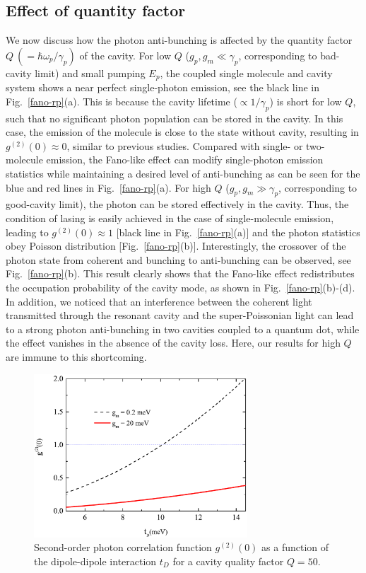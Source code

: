 \documentclass[aps,prb,
,floatfix,footinbib,longbibliography,
preprint
]{revtex4-1}
\begin{document}
\subsection{Effect of quantity factor}
We now discuss how the photon anti-bunching is affected by the quantity factor $Q~(=\hbar\omega_{p}/\gamma_{p})$ of the cavity.
For low $Q$ ($g_{p},g_{m}\ll \gamma_{p}$, corresponding to bad-cavity limit) and small pumping $E_{p}$, the coupled single molecule and cavity system shows a near perfect single-photon emission, see the black line in Fig.~\ref{fano-rp}(a).
This is because the cavity lifetime ($\propto 1/\gamma_{p}$) is short for low $Q$, such that no significant photon population can be stored in the cavity.
In this case, the emission of the molecule is close to the state without cavity, resulting in $g^{(2)}(0)\approx0$, similar to previous studies\cite{PhysRevB.70.115304,PhysRevA.91.061804}.
Compared with single- or two-molecule emission, the Fano-like effect can modify single-photon emission statistics while maintaining
a desired level of anti-bunching as can be seen for the blue and red lines in Fig.~\ref{fano-rp}(a).
For high $Q$ ($g_{p},g_{m}\gg \gamma_{p}$, corresponding to good-cavity limit), the photon can be stored effectively in the cavity. Thus, the condition of lasing is easily achieved in the case of single-molecule emission, leading to $g^{(2)}(0)\approx 1$ [black line in Fig.~\ref{fano-rp}(a)] and the photon statistics obey Poisson distribution [Fig.~\ref{fano-rp}(b)].
Interestingly, the crossover of the photon state from coherent and bunching to anti-bunching can be observed, see Fig.~\ref{fano-rp}(b).
This result clearly shows that the Fano-like effect redistributes the occupation probability of the cavity mode, as shown in Fig.~\ref{fano-rp}(b)-(d).
 In addition, we noticed that an interference between the coherent light transmitted through the resonant cavity and the super-Poissonian light can lead to a strong photon anti-bunching in two cavities coupled to a quantum dot, while the effect vanishes in the absence of the cavity loss\cite{PhysRevLett.108.183601}. Here, our results for high $Q$ are immune to this shortcoming.

\begin{figure}[h]
\centering
\includegraphics[width=8cm]{fano-td.pdf}
\caption{Second-order photon correlation function $g^{(2)}(0)$ as a function of the dipole-dipole interaction $t_{D}$ for a cavity quality factor $Q=50$.}
\label{fano-td}
\end{figure}
\end{document}
